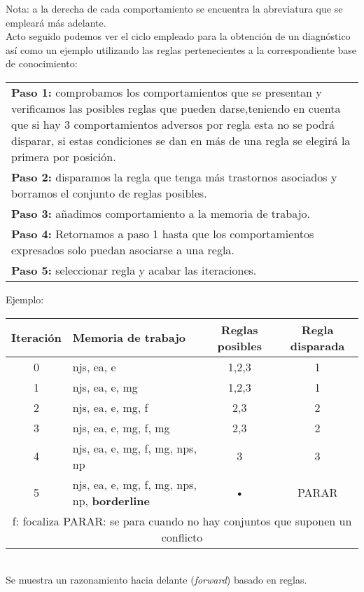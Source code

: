 \documentclass[letterpaper,12pt]{article}
\begin{document}
Nota: a la derecha de cada comportamiento se encuentra la abreviatura que
se empleará más adelante. \\

Acto seguido podemos ver el ciclo empleado para la obtención de un
diagnóstico así como un ejemplo utilizando las reglas pertenecientes a la correspondiente base de conocimiento: \\

\begin{center}
\begin{tabular}{|p{15cm}|}
\hline 
\textbf{Paso 1:} comprobamos los comportamientos que se presentan y verificamos las posibles reglas que pueden darse,teniendo en cuenta que si hay 3 comportamientos adversos por regla esta no se podrá disparar, si estas condiciones se dan en más de una regla se elegirá la primera por posición. \\
\textbf{Paso 2:} disparamos la regla que tenga más trastornos asociados y borramos el conjunto de reglas posibles.\\
\textbf{Paso 3:} añadimos comportamiento a la memoria de trabajo. \\
\textbf{Paso 4:} Retornamos a paso 1 hasta que los comportamientos expresados solo puedan asociarse a una regla.\\
\textbf{Paso 5:} seleccionar regla y acabar las iteraciones. \\ 
\hline 
\end{tabular} 
\end{center}

Ejemplo: \\

\begin{tabular}{|c|l{7cm}|c|c|}
\hline 
Iteración & Memoria de trabajo & Reglas posibles & Regla disparada \\ 
\hline 
0 & njs, ea, e & 1,2,3 & 1 \\ 
\hline 
1 & njs, ea, e, mg & 1,2,3 & 1 \\ 
\hline 
2 & njs, ea, e, mg, f & 2,3 & 2 \\ 
\hline 
3 & njs, ea, e, mg, f, mg & 2,3 & 2 \\ 
\hline 
4 & njs, ea, e, mg, f, mg, nps, np & 3 & 3 \\ 
\hline 
5 & njs, ea, e, mg, f, mg, nps, np, \textbf{borderline} & • & PARAR \\ 
\hline 
\multicolumn{4}{|c|}{f: focaliza PARAR: se para cuando no hay conjuntos que suponen un conflicto} \\ 
\hline 
\end{tabular} \\

Se muestra un razonamiento hacia delante (\textit{forward}) basado en reglas.
\end{document}
